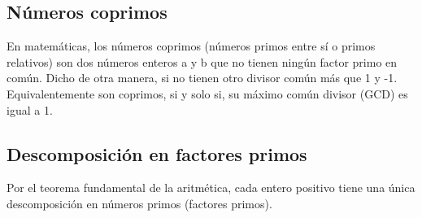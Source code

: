 \subsection{Números coprimos}
En matemáticas, los números coprimos (números primos entre sí o primos relativos) son dos números enteros a y b que no tienen ningún factor primo en común. Dicho de otra manera, si no tienen otro divisor común más que 1 y -1. Equivalentemente son coprimos, si y solo si, su máximo común divisor (GCD) es igual a 1. 

\subsection{Descomposición en factores primos}
Por el teorema fundamental de la aritmética, cada entero positivo tiene una única descomposición en números primos (factores primos). 